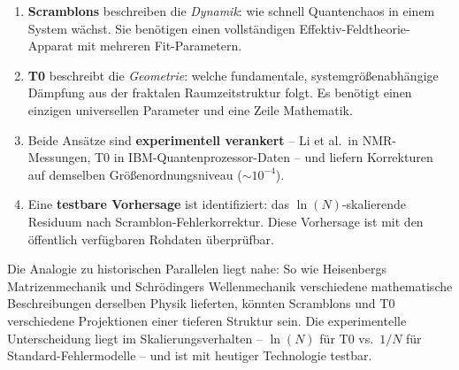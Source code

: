 \begin{enumerate}
	\item \textbf{Scramblons} beschreiben die \emph{Dynamik}: wie schnell Quantenchaos in einem System wächst. Sie benötigen einen vollständigen Effektiv-Feldtheorie-Apparat mit mehreren Fit-Parametern.
	
	\item \textbf{T0} beschreibt die \emph{Geometrie}: welche fundamentale, systemgrößenabhängige Dämpfung aus der fraktalen Raumzeitstruktur folgt. Es benötigt einen einzigen universellen Parameter und eine Zeile Mathematik.
	
	\item Beide Ansätze sind \textbf{experimentell verankert} -- Li et al.\ in NMR-Messungen, T0 in IBM-Quantenprozessor-Daten -- und liefern Korrekturen auf demselben Größenordnungsniveau ($\sim 10^{-4}$).
	
	\item Eine \textbf{testbare Vorhersage} ist identifiziert: das $\ln(N)$-skalierende Residuum nach Scramblon-Fehlerkorrektur. Diese Vorhersage ist mit den öffentlich verfügbaren Rohdaten überprüfbar.
\end{enumerate}

Die Analogie zu historischen Parallelen liegt nahe: So wie Heisenbergs Matrizenmechanik und Schrödingers Wellenmechanik verschiedene mathematische Beschreibungen derselben Physik lieferten, könnten Scramblons und T0 verschiedene Projektionen einer tieferen Struktur sein. Die experimentelle Unterscheidung liegt im Skalierungsverhalten -- $\ln(N)$ für T0 vs.\ $1/N$ für Standard-Fehlermodelle -- und ist mit heutiger Technologie testbar.


